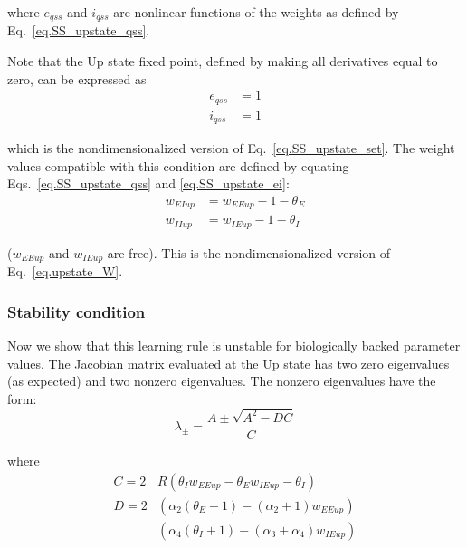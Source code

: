 \documentclass[
twocolumn,
]{article}
\newcommand{\EE}{\mathit{EE}}
\newcommand{\EI}{\mathit{EI}}
\newcommand{\IE}{\mathit{IE}}
\newcommand{\II}{\mathit{II}}
\newcommand{\up}{\mathit{up}}
\newcommand{\qss}{\mathit{qss}}
\begin{document}
\noindent where $e_{\qss}$ and $i_{\qss}$ are nonlinear functions of the weights as defined by Eq.\ \ref{eq.SS_upstate_qss}.

Note that the Up state fixed point, defined by making all derivatives equal to zero, can be expressed as
\begin{equation}
\begin{aligned}
e_{\qss} & = 1 \\
i_{\qss} & = 1
\end{aligned}
\label{eq.SS_upstate_ei}
\end{equation}

\noindent which is the nondimensionalized version of Eq.\ \ref{eq.SS_upstate_set}. The weight values compatible with this condition are defined by equating Eqs.\ \ref{eq.SS_upstate_qss} and \ref{eq.SS_upstate_ei}:
\begin{equation}
\begin{aligned}
w_{\EI\up} & = w_{\EE\up} - 1 - \theta_E \\
w_{\II\up} & = w_{\IE\up} - 1 - \theta_I
\end{aligned}
\label{eq.SS_upstate_w}
\end{equation}

\noindent ($w_{\EE\up}$ and $w_{\IE\up}$ are free). This is the nondimensionalized version of Eq.\ \ref{eq.upstate_W}.


\subsubsection{Stability condition}

Now we show that this learning rule is unstable for biologically backed parameter values. The Jacobian matrix evaluated at the Up state has two zero eigenvalues (as expected) and two nonzero eigenvalues. The nonzero eigenvalues have the form:
\begin{equation}
\lambda_{\pm} = \frac{A \pm \sqrt{A^2 - DC}}{C}
\label{eq.SS_eigvals}
\end{equation}

\noindent where
\begin{displaymath}
\begin{aligned}
C = 2 & R(\theta_I w_{\EE\up} - \theta_E w_{\IE\up}  - \theta_I) \\
D = 2 & (\alpha_2(\theta_E + 1) - (\alpha_2 + 1) w_{\EE\up}) \\
& (\alpha_4(\theta_I + 1) - (\alpha_3 + \alpha_4) w_{\IE\up})
\end{aligned}
\end{displaymath}
\end{document}
